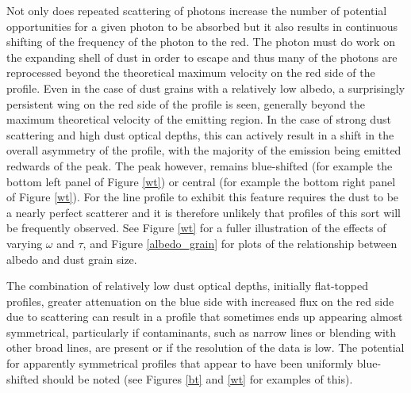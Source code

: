 \documentclass[useAMS,usenatbib,usegraphicx]{mnras}
\begin{document}
Not only does 
repeated scattering of photons increase the number of potential 
opportunities for a given photon to be absorbed but it also results in 
continuous shifting of the frequency of the photon to the red.  The photon 
must do work on the expanding shell of dust in order to escape and thus 
many of the photons are reprocessed beyond the theoretical maximum 
velocity on the red side of the profile.  Even in the case of dust grains 
with a relatively low albedo, a surprisingly persistent wing on the red 
side of the profile is seen, generally beyond the maximum theoretical velocity 
of the emitting region. In the case of strong 
dust scattering and high dust optical depths, this can actively result in a 
shift in the overall asymmetry of the profile, with the majority of the 
emission being emitted redwards of the peak.
The peak however, remains blue-shifted (for example the bottom left panel of Figure \ref{wt}) or central (for example the bottom right panel of Figure \ref{wt}).  
For the line profile to exhibit this feature requires the dust to be a 
nearly perfect scatterer and it is therefore unlikely that profiles of this sort will be
frequently observed.  See Figure \ref{wt} for a fuller illustration of the effects of varying
$\omega$ and $\tau$, and Figure \ref{albedo_grain} for plots of the relationship between albedo and dust grain size.

The combination of relatively low dust optical depths, initially flat-topped 
profiles, greater attenuation on the blue side with increased flux on the 
red side due to scattering can result in a profile that sometimes  ends up appearing 
almost symmetrical, particularly if 
contaminants, such as narrow lines or blending with other broad lines, are 
present or if the resolution of the data is low.  The potential for apparently 
symmetrical profiles that appear to have been uniformly blue-shifted 
should be noted (see Figures \ref{bt} and \ref{wt} for examples of this).



\end{document}
